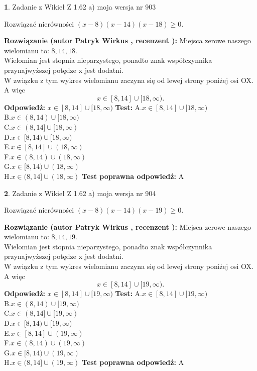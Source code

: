 \documentclass[12pt, a4paper]{article}
\theoremstyle{definition} %
\newtheorem{zad}{}
\newcommand{\zadStart}[1]{\begin{zad}#1\newline}
\newcommand{\zadStop}{\end{zad}}
\newcommand{\rozwStart}[2]{\noindent \textbf{Rozwiązanie (autor #1 , recenzent #2): }\newline}
\newcommand{\rozwStop}{\newline}
\newcommand{\odpStart}{\noindent \textbf{Odpowiedź:}\newline}
\newcommand{\odpStop}{\newline}
\newcommand{\testStart}{\noindent \textbf{Test:}\newline}
\newcommand{\testStop}{\newline}
\newcommand{\kluczStart}{\noindent \textbf{Test poprawna odpowiedź:}\newline}
\newcommand{\kluczStop}{\newline}
\begin{document}
\zadStart{Zadanie z Wikieł Z 1.62 a) moja wersja nr 903}

Rozwiązać nierówności $(x-8)(x-14)(x-18)\ge0$.
\zadStop
\rozwStart{Patryk Wirkus}{}
Miejsca zerowe naszego wielomianu to: $8, 14, 18$.\\
Wielomian jest stopnia nieparzystego, ponadto znak współczynnika przy\linebreak najwyższej potędze x jest dodatni.\\ W związku z tym wykres wielomianu zaczyna się od lewej strony poniżej osi OX. A więc $$x \in [8,14] \cup [18,\infty).$$
\rozwStop
\odpStart
$x \in [8,14] \cup [18,\infty)$
\odpStop
\testStart
A.$x \in [8,14] \cup [18,\infty)$\\
B.$x \in (8,14) \cup [18,\infty)$\\
C.$x \in (8,14] \cup [18,\infty)$\\
D.$x \in [8,14) \cup [18,\infty)$\\
E.$x \in [8,14] \cup (18,\infty)$\\
F.$x \in (8,14) \cup (18,\infty)$\\
G.$x \in [8,14) \cup (18,\infty)$\\
H.$x \in (8,14] \cup (18,\infty)$
\testStop
\kluczStart
A
\kluczStop



\zadStart{Zadanie z Wikieł Z 1.62 a) moja wersja nr 904}

Rozwiązać nierówności $(x-8)(x-14)(x-19)\ge0$.
\zadStop
\rozwStart{Patryk Wirkus}{}
Miejsca zerowe naszego wielomianu to: $8, 14, 19$.\\
Wielomian jest stopnia nieparzystego, ponadto znak współczynnika przy\linebreak najwyższej potędze x jest dodatni.\\ W związku z tym wykres wielomianu zaczyna się od lewej strony poniżej osi OX. A więc $$x \in [8,14] \cup [19,\infty).$$
\rozwStop
\odpStart
$x \in [8,14] \cup [19,\infty)$
\odpStop
\testStart
A.$x \in [8,14] \cup [19,\infty)$\\
B.$x \in (8,14) \cup [19,\infty)$\\
C.$x \in (8,14] \cup [19,\infty)$\\
D.$x \in [8,14) \cup [19,\infty)$\\
E.$x \in [8,14] \cup (19,\infty)$\\
F.$x \in (8,14) \cup (19,\infty)$\\
G.$x \in [8,14) \cup (19,\infty)$\\
H.$x \in (8,14] \cup (19,\infty)$
\testStop
\kluczStart
A
\kluczStop
\end{document}
